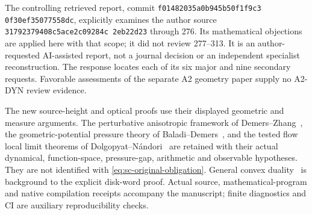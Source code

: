 \documentclass[11pt,reqno]{amsart}
\numberwithin{equation}{section}
\theoremstyle{definition}\newtheorem{definition}[theorem]{Definition}
\theoremstyle{remark}\newtheorem{remark}[theorem]{Remark}
\begin{document}
The controlling retrieved report, commit
\texttt{f0148203\allowbreak 5a0b945b\allowbreak 50f1f9c3\allowbreak
0f30ef35\allowbreak 077558dc},
explicitly examines the author source
\texttt{31792379\allowbreak 408c5ace\allowbreak 2c09284c\allowbreak
2eb22d23}
through 276.  Its mathematical objections are applied here with
that scope; it did not review 277--313.  It is an author-requested
AI-assisted report, not a journal decision or an independent
specialist reconstruction.  The response locates each of its six
major and nine secondary requests.  Favorable assessments of the
separate A2 geometry paper supply no A2-DYN review evidence.

The new source-height and optical proofs use their displayed
geometric and measure arguments.  The perturbative anisotropic
framework of Demers--Zhang~\cite{DZUniform}, the
geometric-potential pressure theory of
Baladi--Demers~\cite{BDPressure}, and the tested flow local limit
theorems of Dolgopyat--N\'andori~\cite{DNFlow} are retained with
their actual dynamical, function-space, pressure-gap, arithmetic
and observable hypotheses.  They are not identified with
\eqref{eq:sc-original-obligation}.  General convex
duality~\cite{BVNotes} is background to the explicit disk-word
proof.  Actual source, mathematical-program and native compilation
receipts accompany the manuscript; finite diagnostics and CI are
auxiliary reproducibility checks.
\end{document}
